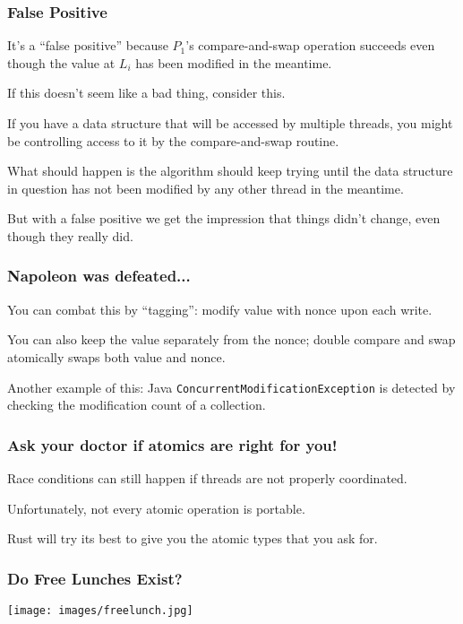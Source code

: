 \begin{frame}
\frametitle{False Positive}

It's a ``false positive'' because $P_{1}$'s compare-and-swap operation succeeds even though the value at $L_{i}$ has been modified in the meantime. 

If this doesn't seem like a bad thing, consider this. 

If you have a data structure that will be accessed by multiple threads, you might be controlling access to it by the compare-and-swap routine. 

What should happen is the algorithm should keep trying until the data structure in question has not been modified by any other thread in the meantime. 

But with a false positive we get the impression that things didn't change, even though they really did.

\end{frame}



\begin{frame}
\frametitle{Napoleon was defeated...}

You can combat this by ``tagging'': modify value with nonce upon each
write.  

You can also keep the value separately from the nonce; double
compare and swap atomically swaps both value and nonce.

Another example of this: Java \texttt{ConcurrentModificationException} is detected by checking the modification count of a collection.

\end{frame}


\begin{frame}
\frametitle{Ask your doctor if atomics are right for you!}

Race conditions can still happen if threads are not properly coordinated.

Unfortunately, not every atomic operation is portable. 

Rust will try its best to give you the atomic types that you ask for.

\end{frame}



\begin{frame}
\frametitle{Do Free Lunches Exist?}

\begin{center}
\texttt{[image: images/freelunch.jpg]}
\end{center}

\end{frame}


